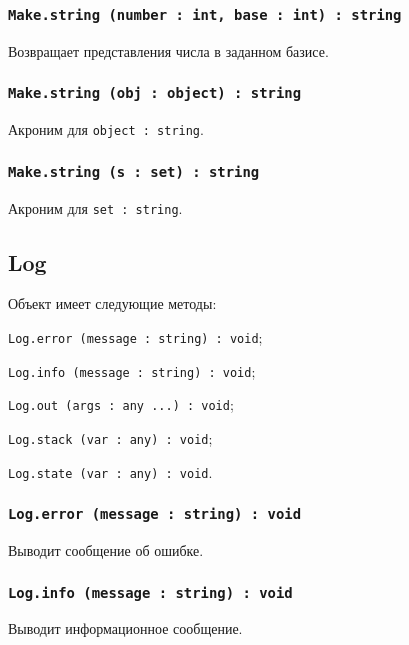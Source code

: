 \subsubsection{\lstinline|Make.string (number : int, base : int) : string|}

Возвращает представления числа в заданном базисе.

\subsubsection{\lstinline|Make.string (obj : object) : string|}

Акроним для \lstinline|object : string|.

\subsubsection{\lstinline|Make.string (s : set) : string|}

Акроним для \lstinline|set : string|.

\subsection{{\color{orange} Log}}

Объект \logtype{} имеет следующие методы:
\begin{icItems}
	\item \lstinline|Log.error (message : string) : void|;
	\item \lstinline|Log.info (message : string) : void|;
	\item \lstinline|Log.out (args : any ...) : void|;
	\item \lstinline|Log.stack (var : any) : void|;
	\item \lstinline|Log.state (var : any) : void|.
\end{icItems}

\subsubsection{\lstinline|Log.error (message : string) : void|}

Выводит сообщение об ошибке.

\subsubsection{\lstinline|Log.info (message : string) : void|}

Выводит информационное сообщение.

